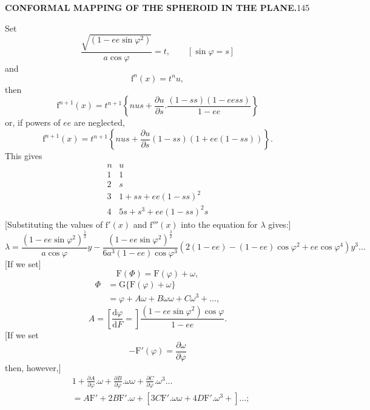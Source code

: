 \par\clearpage
\noindent\null\hfill{\small\textbf{CONFORMAL MAPPING OF THE SPHEROID IN THE PLANE.}}\hfill145\par\medskip
Set
\[\frac{\sqrt{(1-ee\sin\varphi^2)}}{a\cos\varphi}=t,\qquad[\sin\varphi=s]\]
\noindent and
\[\mathrm f^n(x)=t^nu,\]
\noindent then
\[\mathrm f^{n+1}(x)=t^{n+1}\left\{nus+\frac{\partial u}{\partial s}.\frac{(1-ss)(1-eess)}{1-ee}\right\}\]
\noindent or, if powers of \(ee\) are neglected,
\[\mathrm f^{n+1}(x)=t^{n+1}\left\{nus+\frac{\partial u}{\partial s}(1-ss)(1+ee(1-ss))\right\}.\]
This gives
\[
\begin{array}{c|c}
n&u\\\hline
1&1\\2&s\\3&1+ss+ee(1-ss)^2\\4&5s+s^3+ee(1-ss)^2s
\end{array}
\]
[Substituting the values of \(\mathrm f'(x)\) and \(\mathrm f'''(x)\) into the equation for \(\lambda\) gives:]
\[
\lambda=\frac{(1-ee\sin\varphi^2)^{\frac12}}{a\cos\varphi}y-\frac{(1-ee\sin\varphi^2)^{\frac32}}{6a^3(1-ee)\cos\varphi^3}(2(1-ee)-(1-ee)\cos\varphi^2+ee\cos\varphi^4)y^3\ldots
\]
[If we set]
\[\mathrm F(\Phi)=\mathrm F(\varphi)+\omega,\]
\[\begin{aligned}\Phi&=\mathrm G\{\mathrm F(\varphi)+\omega\}\\&=\varphi+A\omega+B\omega\omega+C\omega^3+\ldots,\end{aligned}\]
\noindent[where]
\[A=\left[\frac{\mathrm d\varphi}{\mathrm dF}=\right]\frac{(1-ee\sin\varphi^2)\cos\varphi}{1-ee}.\]
[If we set
\[-\mathrm F'(\varphi)=\frac{\partial\omega}{\partial\varphi}\]
\noindent then, however,]
\[
\begin{aligned}
&1+\frac{\partial A}{\partial\varphi}.\omega+\frac{\partial B}{\partial\varphi}.\omega\omega+\frac{\partial C}{\partial\varphi}.\omega^3\ldots\\
&=A\mathrm F'+2B\mathrm F'.\omega+[3C\mathrm F'.\omega\omega+4D\mathrm F'.\omega^3+]\ldots;
\end{aligned}
\]
\par

